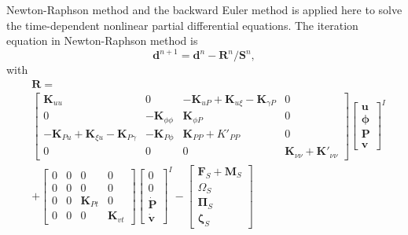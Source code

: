 \documentclass[times,fleqn,11pt]{elsarticle}
\begin{document}
Newton-Raphson method and the backward Euler method is applied here to solve the time-dependent nonlinear partial differential equations. The iteration equation in Newton-Raphson method is 
\begin{equation}
     \mathbf{d}^{n+1}=\mathbf{d}^n-\mathbf{R}^n/\mathbf{S}^n,
\end{equation}
with 
\begin{equation}
    \begin{split}
        &\mathbf{R}= \\
        &\begin{bmatrix}
            \mathbf{K}_{uu} & 0 & -\mathbf{K}_{uP}+\mathbf{K}_{u\xi}-\mathbf{K}_{\gamma P} & 0 \\
            0 & -\mathbf{K}_{\phi\phi} & \mathbf{K}_{\phi P} & 0 \\
            -\mathbf{K}_{Pu}+\mathbf{K}_{\xi u}-\mathbf{K}_{P \gamma} & -\mathbf{K}_{P\phi } & \mathbf{K}_{PP}+K'_{PP} & 0 \\
            0 & 0 & 0 & \mathbf{K}_{\nu\nu}+\mathbf{K}'_{\nu\nu}
        \end{bmatrix}
        \begin{bmatrix}
            \mathbf{u}\\ \mathbf{\phi} \\ \mathbf{P} \\ \mathbf{v}
        \end{bmatrix}^I \\
        &+ 
        \begin{bmatrix}
            0 & 0 & 0 & 0 \\
            0 & 0 & 0 & 0 \\
            0 & 0 & \mathbf{K}_{Pt} & 0 \\
            0 & 0 & 0 & \mathbf{K}_{vt} 
        \end{bmatrix}
        \begin{bmatrix}
            0\\ 0 \\ \dot{\mathbf{P}} \\ \dot{\mathbf{v}}
        \end{bmatrix}^I
        -
        \begin{bmatrix}
            \mathbf{F}_S+\mathbf{M}_S \\
            {\Omega}_S \\
            \mathbf{\Pi}_S \\
            \mathbf{\zeta}_S
        \end{bmatrix}
    \end{split}
\end{equation}
\end{document}
